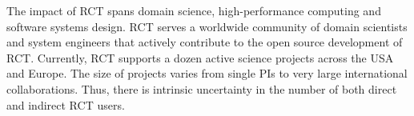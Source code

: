 \documentclass[preprint,12pt, a4paper]{elsarticle}
\begin{document}



The impact of RCT spans domain science, high-performance computing and
software systems design. RCT serves a worldwide community of domain
scientists and system engineers that actively contribute to the open source
development of RCT. Currently, RCT supports a dozen active science projects
across the USA and Europe. The size of projects varies from single PIs to
very large international collaborations. Thus, there is intrinsic uncertainty
in the number of both direct and indirect RCT users.
\end{document}
